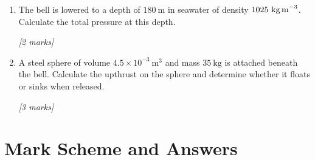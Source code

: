\begin{tcolorbox}[colback=white, colframe=midblue, breakable]
\begin{enumerate}[label=(\alph*)]
  \item \begin{minipage}[t]{\linewidth}
  The bell is lowered to a depth of $180\ \text{m}$ in seawater of density $1025\ \text{kg\,m}^{-3}$. Calculate the total pressure at this depth.
  \par\hfill\textit{[2 marks]}
  \vspace{3.5cm}
  \end{minipage}

  \item \begin{minipage}[t]{\linewidth}
  A steel sphere of volume $4.5 \times 10^{-3}\ \text{m}^3$ and mass $35\ \text{kg}$ is attached beneath the bell. Calculate the upthrust on the sphere and determine whether it floats or sinks when released.
  \par\hfill\textit{[3 marks]}
  \vspace{4.5cm}
  \end{minipage}
\end{enumerate}

\end{tcolorbox}

\pagebreak


\section{Mark Scheme and Answers}

